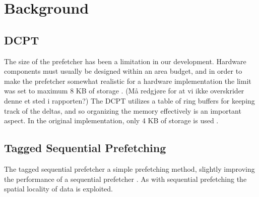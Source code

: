 \section{Background}

\subsection*{DCPT}

The size of the prefetcher has been a limitation in our development. Hardware
components must usually be designed within an area budget, and in order to make
the prefetcher somewhat realistic for a hardware implementation the limit was
set to maximum 8 KB of storage \cite{guidelines}. (Må redgjøre for at vi ikke overskrider denne et
sted i rapporten?) The DCPT utilizes a table of ring buffers for keeping track
of the deltas, and so organizing the memory effectively is an important aspect.
In the original implementation, only 4 KB of storage is used \cite{dcpt}.

\subsection*{Tagged Sequential Prefetching}

The tagged sequential prefetcher a simple prefetching method, slightly improving
the performance of a sequential prefetcher \cite{grannaes}. As with sequential
prefetching the spatial locality of data is exploited.


